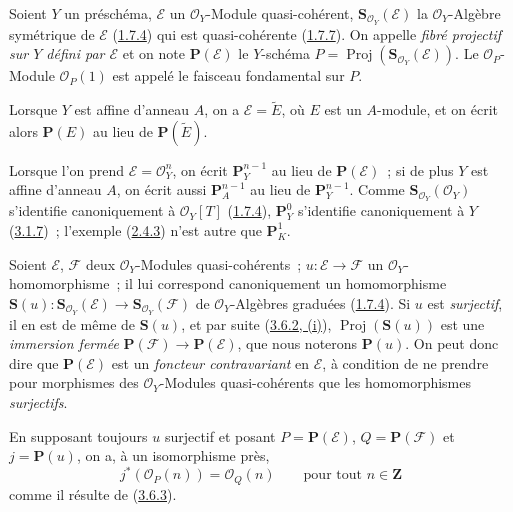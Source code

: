 \begin{definition}[4.1.1]
\label{II.4.1.1-fr}
Soient $Y$ un préschéma, $\mathcal{E}$ un $\mathcal{O}_Y$-Module
quasi-cohérent, $\mathbf{S}_{\mathcal{O}_Y}(\mathcal{E})$ la
$\mathcal{O}_Y$-Algèbre symétrique de $\mathcal{E}$
\textup{(\hyperref[II.1.7.4-fr]{1.7.4})} qui est quasi-cohérente
\textup{(\hyperref[II.1.7.7-fr]{1.7.7})}. On appelle \emph{fibré projectif sur $Y$
défini par $\mathcal{E}$} et on note $\mathbf{P}(\mathcal{E})$ le $Y$-schéma
$P=\operatorname{Proj}(\mathbf{S}_{\mathcal{O}_Y}(\mathcal{E}))$. Le
$\mathcal{O}_P$-Module $\mathcal{O}_P(1)$ est appelé le faisceau
fondamental sur $P$.
\end{definition}

Lorsque $Y$ est affine d'anneau $A$, on a $\mathcal{E}=\widetilde{E}$, où
$E$ est un $A$-module, et on écrit alors $\mathbf{P}(E)$ au lieu de
$\mathbf{P}(\widetilde{E})$.

Lorsque l'on prend $\mathcal{E}=\mathcal{O}_Y^n$, on écrit
$\mathbf{P}_Y^{n-1}$ au lieu de $\mathbf{P}(\mathcal{E})$~; si de plus $Y$
est affine d'anneau $A$, on écrit aussi $\mathbf{P}_A^{n-1}$ au lieu de
$\mathbf{P}_Y^{n-1}$. Comme
$\mathbf{S}_{\mathcal{O}_Y}(\mathcal{O}_Y)$ s'identifie canoniquement à
$\mathcal{O}_Y[T]$ (\hyperref[II.1.7.4-fr]{1.7.4}),
$\mathbf{P}_Y^0$ s'identifie canoniquement à $Y$
(\hyperref[II.3.1.7-fr]{3.1.7})~; l'exemple
(\hyperref[II.2.4.3-fr]{2.4.3}) n'est autre que $\mathbf{P}_K^1$.

\begin{env}[4.1.2]
\label{II.4.1.2-fr}
Soient $\mathcal{E}$, $\mathcal{F}$ deux $\mathcal{O}_Y$-Modules
quasi-cohérents~; $u:\mathcal{E}\to\mathcal{F}$ un
$\mathcal{O}_Y$-homomorphisme~; il lui correspond canoniquement un
homomorphisme
$\mathbf{S}(u):\mathbf{S}_{\mathcal{O}_Y}(\mathcal{E})\to
\mathbf{S}_{\mathcal{O}_Y}(\mathcal{F})$ de $\mathcal{O}_Y$-Algèbres
graduées (\hyperref[II.1.7.4-fr]{1.7.4}). Si $u$ est \emph{surjectif}, il en
est de même de $\mathbf{S}(u)$, et par suite
(\hyperref[II.3.6.2-fr]{3.6.2, (i)}),
$\operatorname{Proj}(\mathbf{S}(u))$ est une \emph{immersion fermée}
$\mathbf{P}(\mathcal{F})\to\mathbf{P}(\mathcal{E})$, que nous noterons
$\mathbf{P}(u)$. On peut donc dire que $\mathbf{P}(\mathcal{E})$ est un
\emph{foncteur contravariant} en $\mathcal{E}$, à condition de ne prendre
pour morphismes des $\mathcal{O}_Y$-Modules quasi-cohérents que les
homomorphismes \emph{surjectifs}.

En supposant toujours $u$ surjectif et posant
$P=\mathbf{P}(\mathcal{E})$, $Q=\mathbf{P}(\mathcal{F})$ et
$j=\mathbf{P}(u)$, on a, à un isomorphisme près,
\[
\label{II.4.1.2.1-fr}
  j^*(\mathcal{O}_P(n))=\mathcal{O}_Q(n)
  \qquad\text{pour tout }n\in\mathbf{Z}
\tag{4.1.2.1}
\]
comme il résulte de (\hyperref[II.3.6.3-fr]{3.6.3}).
\end{env}

